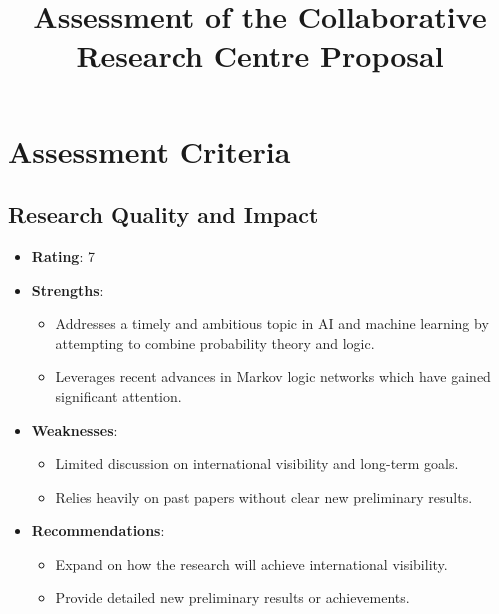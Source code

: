 \documentclass{article}
\begin{document}
\title{Assessment of the Collaborative Research Centre Proposal}
\author{}
\date{}
\maketitle

\section{Assessment Criteria}

\subsection{Research Quality and Impact}
\begin{itemize}
    \item \textbf{Rating}: 7
    \item \textbf{Strengths}: 
    \begin{itemize}
        \item Addresses a timely and ambitious topic in AI and machine learning by attempting to combine probability theory and logic.
        \item Leverages recent advances in Markov logic networks which have gained significant attention.
    \end{itemize}
    \item \textbf{Weaknesses}: 
    \begin{itemize}
        \item Limited discussion on international visibility and long-term goals.
        \item Relies heavily on past papers without clear new preliminary results.
    \end{itemize}
    \item \textbf{Recommendations}: 
    \begin{itemize}
        \item Expand on how the research will achieve international visibility.
        \item Provide detailed new preliminary results or achievements.
    \end{itemize}
\end{itemize}
\end{document}
